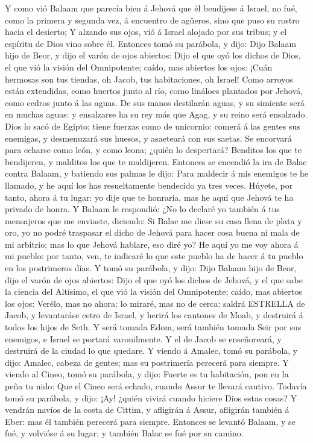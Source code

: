  Y como vió Balaam que parecía bien á Jehová que él
bendijese á Israel, no fué, como la primera y segunda vez, á encuentro
de agüeros, sino que puso su rostro hacia el desierto;  Y
alzando sus ojos, vió á Israel alojado por sus tribus; y el espíritu de
Dios vino sobre él.  Entonces tomó su parábola, y dijo: Dijo
Balaam hijo de Beor, y dijo el varón de ojos abiertos:  Dijo
el que oyó los dichos de Dios, el que vió la visión del Omnipotente;
caído, mas abiertos los ojos:  ¡Cuán hermosas son tus
tiendas, oh Jacob, tus habitaciones, oh Israel!  Como
arroyos están extendidas, como huertos junto al río, como lináloes
plantados por Jehová, como cedros junto á las aguas.  De sus
manos destilarán aguas, y su simiente será en muchas aguas: y ensalzarse
ha su rey más que Agag, y su reino será ensalzado.  Dios lo
sacó de Egipto; tiene fuerzas como de unicornio: comerá á las gentes sus
enemigas, y desmenuzará sus huesos, y asaeteará con sus saetas.
 Se encorvará para echarse como león, y como leona; ¿quién
lo despertará? Benditos los que te bendijeren, y malditos los que te
maldijeren.  Entonces se encendió la ira de Balac contra
Balaam, y batiendo sus palmas le dijo: Para maldecir á mis enemigos te
he llamado, y he aquí los has resueltamente bendecido ya tres veces.
 Húyete, por tanto, ahora á tu lugar: yo dije que te
honraría, mas he aquí que Jehová te ha privado de honra.  Y
Balaam le respondió: ¿No lo declaré yo también á tus mensajeros que me
enviaste, diciendo:  Si Balac me diese su casa llena de
plata y oro, yo no podré traspasar el dicho de Jehová para hacer cosa
buena ni mala de mi arbitrio; mas lo que Jehová hablare, eso diré yo?
 He aquí yo me voy ahora á mi pueblo: por tanto, ven, te
indicaré lo que este pueblo ha de hacer á tu pueblo en los postrimeros
días.  Y tomó su parábola, y dijo: Dijo Balaam hijo de
Beor, dijo el varón de ojos abiertos:  Dijo el que oyó los
dichos de Jehová, y el que sabe la ciencia del Altísimo, el que vió la
visión del Omnipotente; caído, mas abiertos los ojos: 
Verélo, mas no ahora: lo miraré, mas no de cerca: saldrá ESTRELLA de
Jacob, y levantaráse cetro de Israel, y herirá los cantones de Moab, y
destruirá á todos los hijos de Seth.  Y será tomada Edom,
será también tomada Seir por sus enemigos, e Israel se portará
varonilmente.  Y el de Jacob se enseñoreará, y destruirá de
la ciudad lo que quedare.  Y viendo á Amalec, tomó su
parábola, y dijo: Amalec, cabeza de gentes; mas su postrimería perecerá
para siempre.  Y viendo al Cineo, tomó su parábola, y dijo:
Fuerte es tu habitación, pon en la peña tu nido:  Que el
Cineo será echado, cuando Assur te llevará cautivo. 
Todavía tomó su parábola, y dijo: ¡Ay! ¿quién vivirá cuando hiciere Dios
estas cosas?  Y vendrán navíos de la costa de Cittim, y
afligirán á Assur, afligirán también á Eber: mas él también perecerá
para siempre.  Entonces se levantó Balaam, y se fué, y
volvióse á su lugar: y también Balac se fué por su camino.

